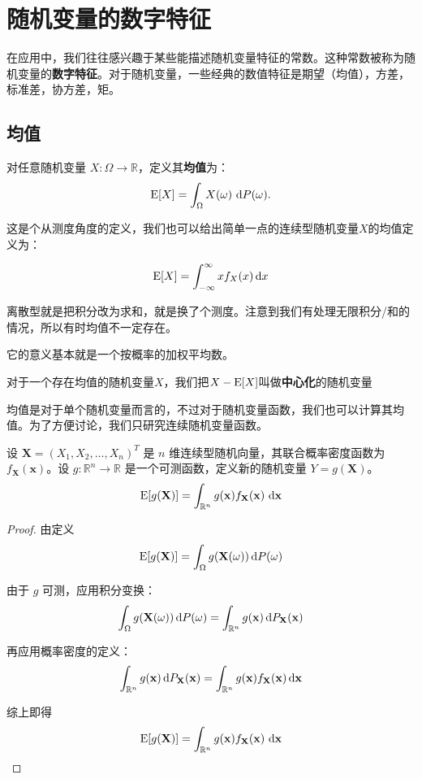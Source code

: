 \section{随机变量的数字特征}
在应用中，我们往往感兴趣于某些能描述随机变量特征的常数。这种常数被称为随机变量的\textbf{数字特征}。对于随机变量，一些经典的数值特征是期望（均值），方差，标准差，协方差，矩。

\subsection{均值}

对任意随机变量 $X: \Omega \to \mathbb{R}$，定义其\textbf{均值}为：
\[
\operatorname{E}[X] = \int_\Omega X(\omega) \, \mathop{}\!\mathrm{d} P(\omega).
\]

这是个从测度角度的定义，我们也可以给出简单一点的连续型随机变量$X$的均值定义为：

\[
\operatorname{E}[X]=\int_{-\infty}^{\infty} xf_X(x)\mathop{}\!\mathrm{d} x
\]

离散型就是把积分改为求和，就是换了个测度。注意到我们有处理无限积分/和的情况，所以有时均值不一定存在。

它的意义基本就是一个按概率的加权平均数。

对于一个存在均值的随机变量$X$，我们把$X-\operatorname{E}[X]$叫做\textbf{中心化}的随机变量

均值是对于单个随机变量而言的，不过对于随机变量函数，我们也可以计算其均值。为了方便讨论，我们只研究连续随机变量函数。

\begin{theorem}
设 \(\mathbf{X} = (X_1, X_2, \dots, X_n)^T\) 是 \(n\) 维连续型随机向量，其联合概率密度函数为 \(f_{\mathbf{X}}(\mathbf{x})\)。设 \(g: \mathbb{R}^n \to \mathbb{R}\) 是一个可测函数，定义新的随机变量 \(Y = g(\mathbf{X})\)。
\[
\operatorname{E}[g(\mathbf{X})] = \int_{\mathbb{R}^n} g(\mathbf{x}) f_{\mathbf{X}}(\mathbf{x}) \, \mathop{}\!\mathrm{d} \mathbf{x}
\]
\end{theorem}

\begin{proof}
由定义
\[
\operatorname{E}[g(\mathbf{X})] = \int_\Omega g(\mathbf{X}(\omega))  \mathop{}\!\mathrm{d} P(\omega)
\]

由于 $g$ 可测，应用积分变换：
\[
\int_\Omega g(\mathbf{X}(\omega)) \mathop{}\!\mathrm{d} P(\omega) = \int_{\mathbb{R}^n} g(\mathbf{x}) \mathop{}\!\mathrm{d} P_{\mathbf{X}}(\mathbf{x})
\]

再应用概率密度的定义：
\[
\int_{\mathbb{R}^n} g(\mathbf{x}) \mathop{}\!\mathrm{d} P_{\mathbf{X}}(\mathbf{x}) = \int_{\mathbb{R}^n} g(\mathbf{x}) f_{\mathbf{X}}(\mathbf{x}) \mathop{}\!\mathrm{d}\mathbf{x}
\]

综上即得
\[
\operatorname{E}[g(\mathbf{X})] = \int_{\mathbb{R}^n} g(\mathbf{x}) f_{\mathbf{X}}(\mathbf{x}) \, \mathop{}\!\mathrm{d}\mathbf{x}
\]
\end{proof}

